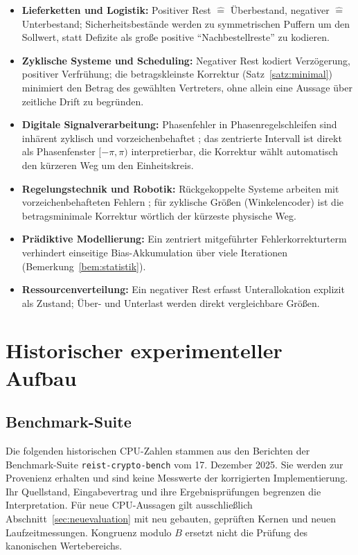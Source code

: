 \documentclass[11pt,a4paper]{scrartcl}
\theoremstyle{definition}
\theoremstyle{plain}
\theoremstyle{remark}
\begin{document}
\begin{itemize}
\item \textbf{Lieferketten und Logistik:} Positiver Rest $\mathrel{\hat{=}}$ Überbestand, negativer $\mathrel{\hat{=}}$ Unterbestand; Sicherheitsbestände werden zu symmetrischen Puffern um den Sollwert, statt Defizite als große positive \enquote{Nachbestellreste} zu kodieren.
\item \textbf{Zyklische Systeme und Scheduling:} Negativer Rest kodiert Verzögerung, positiver Verfrühung; die betragskleinste Korrektur (Satz~\ref{satz:minimal}) minimiert den Betrag des gewählten Vertreters, ohne allein eine Aussage über zeitliche Drift zu begründen.
\item \textbf{Digitale Signalverarbeitung:} Phasenfehler in Phasenregelschleifen sind inhärent zyklisch und vorzeichenbehaftet \cite{oppenheim}; das zentrierte Intervall ist direkt als Phasenfenster $[-\pi, \pi)$ interpretierbar, die Korrektur wählt automatisch den kürzeren Weg um den Einheitskreis.
\item \textbf{Regelungstechnik und Robotik:} Rückgekoppelte Systeme arbeiten mit vorzeichenbehafteten Fehlern \cite{astrom}; für zyklische Größen (Winkelencoder) ist die betragsminimale Korrektur wörtlich der kürzeste physische Weg.
\item \textbf{Prädiktive Modellierung:} Ein zentriert mitgeführter Fehlerkorrekturterm verhindert einseitige Bias-Akkumulation über viele Iterationen (Bemerkung~\ref{bem:statistik}).
\item \textbf{Ressourcenverteilung:} Ein negativer Rest erfasst Unterallokation explizit als Zustand; Über- und Unterlast werden direkt vergleichbare Größen.
\end{itemize}

\section{Historischer experimenteller Aufbau}
\label{sec:aufbau}

\subsection{Benchmark-Suite}

Die folgenden historischen CPU-Zahlen stammen aus den Berichten der
Benchmark-Suite \texttt{reist-crypto-bench} \cite{repo} vom 17. Dezember 2025.
Sie werden zur Provenienz erhalten und sind keine Messwerte der korrigierten
Implementierung. Ihr Quellstand, Eingabevertrag und ihre Ergebnisprüfungen
begrenzen die Interpretation. Für neue CPU-Aussagen gilt ausschließlich
Abschnitt~\ref{sec:neuevaluation} mit neu gebauten, geprüften Kernen und neuen
Laufzeitmessungen. Kongruenz modulo $B$ ersetzt nicht die Prüfung des
kanonischen Wertebereichs.
\end{document}
